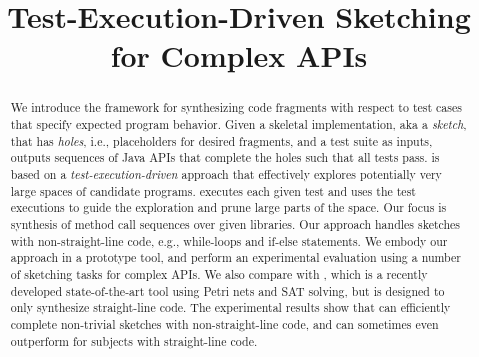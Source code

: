 \documentclass[10pt,conference]{IEEEtran}
\begin{document}
\title{Test-Execution-Driven Sketching for Complex APIs}



\maketitle

\begin{abstract}

  We introduce the \tool framework for synthesizing code fragments
  with respect to test cases that specify expected program behavior.
  Given a skeletal implementation, aka a \emph{sketch}, that has
  \emph{holes}, i.e., placeholders for desired fragments, and a test
  suite as inputs, \tool outputs sequences of Java APIs that
  complete the holes such that all tests pass.  \tool is based on a
  \emph{test-execution-driven} approach that effectively explores
  potentially very large spaces of candidate programs.  \tool executes
  each given test and uses the test executions to guide the
  exploration and prune large parts of the space.  Our focus is
  synthesis of method call sequences over given libraries.  Our
  approach handles sketches with non-straight-line code, e.g.,
  while-loops and if-else statements.  We embody our approach in a prototype tool, and perform an
  experimental evaluation using a number of sketching tasks for
  complex APIs.  We also compare \tool with \spt, which is a recently
  developed state-of-the-art tool using Petri nets and SAT
  solving, but is designed to only synthesize straight-line code.  The
  experimental results show that \tool can efficiently complete
  non-trivial sketches with non-straight-line code, and can sometimes
  even outperform \spt for subjects with straight-line code.

\end{abstract}
\end{document}
